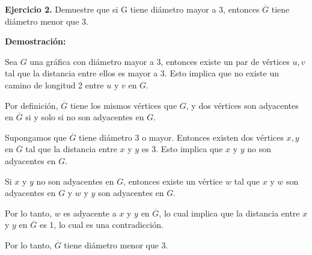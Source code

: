 \textbf{Ejercicio 2.} Demuestre que si G tiene diámetro mayor a 3, entonces 
$\overline{G}$ tiene diámetro menor que 3.

\textbf{Demostración:}

Sea $G$ una gráfica con diámetro mayor a 3, entonces existe un par de vértices 
$u,v$ tal que la distancia entre ellos es mayor a 3. Esto implica que no existe 
un camino de longitud 2 entre $u$ y $v$ en $G$. 

Por definición, $\overline{G}$ tiene los mismos vértices que $G$, y dos vértices 
son adyacentes en $\overline{G}$ si y solo si no son adyacentes en $G$. 

Supongamos que $\overline{G}$ tiene diámetro 3 o mayor. Entonces existen dos
vértices $x,y$ en $\overline{G}$ tal que la distancia entre $x$ y $y$ es 3. 
Esto implica que $x$ y $y$ no son adyacentes en $G$. 

Si $x$ y $y$ no son adyacentes en $G$, entonces existe un vértice $w$ tal que 
$x$ y $w$ son adyacentes en $G$ y $w$ y $y$ son adyacentes en $G$. 

Por lo tanto, $w$ es adyacente a $x$ y $y$ en $\overline{G}$, lo cual implica 
que la distancia entre $x$ y $y$ en $\overline{G}$ es 1, lo cual es una 
contradicción. 

Por lo tanto, $\overline{G}$ tiene diámetro menor que 3.

\QED
